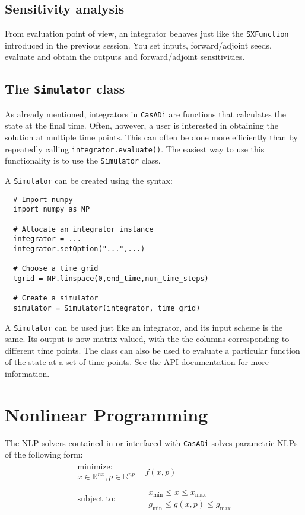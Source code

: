 \documentclass[a4paper,12pt]{book}
\newcommand{\CasADi}{\texttt{CasADi}\xspace}
\begin{document}
\section{Sensitivity analysis}
From evaluation point of view, an integrator behaves just like the \texttt{SXFunction} introduced in the previous session. You set inputs, forward/adjoint seeds, evaluate and obtain the outputs and forward/adjoint sensitivities.

\section{The \texttt{Simulator} class}
As already mentioned, integrators in \CasADi are functions that calculates the state at the final time. Often, however, a user is interested in obtaining the solution at multiple time points. This can often be done more efficiently than by repeatedly calling \texttt{integrator.evaluate()}. The easiest way to use this functionality is to use the \texttt{Simulator} class.

A \texttt{Simulator} can be created using the syntax:
\begin{verbatim}
  # Import numpy
  import numpy as NP

  # Allocate an integrator instance
  integrator = ...
  integrator.setOption("...",...)

  # Choose a time grid
  tgrid = NP.linspace(0,end_time,num_time_steps)

  # Create a simulator
  simulator = Simulator(integrator, time_grid)
\end{verbatim}

A \texttt{Simulator} can be used just like an integrator, and its input scheme is the same. Its output is now matrix valued, with the the columns corresponding to different time points. The class can also be used to evaluate a particular function of the state at a set of time points. See the API documentation for more information.

\chapter{Nonlinear Programming} \label{ch:nlp}
The NLP solvers contained in or interfaced with \CasADi solves parametric NLPs of the following form:
\begin{equation}
\begin{array}{cc}
\begin{array}{c}
\text{minimize:} \\
x \in \mathbb{R}^{nx}, p \in \mathbb{R}^{np}
\end{array}
&
f(x,p)
\\
\begin{array}{c}
\text{subject to:}
\end{array}
&
\begin{array}{c}
x_{\min} \le x \le x_{\max} \\
g_{\min} \le g(x,p) \le g_{\max}
\end{array}
\end{array}
\end{equation}
\end{document}
